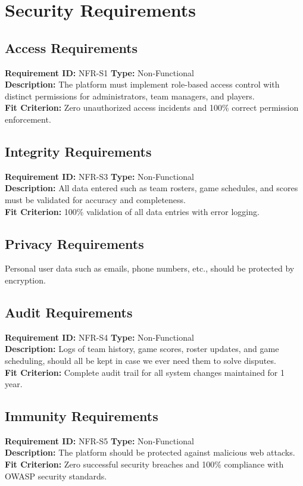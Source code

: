 \documentclass[12pt, titlepage]{article}
\begin{document}
\section{Security Requirements}
\subsection{Access Requirements}
\textbf{Requirement ID:} NFR-S1 \quad \textbf{Type:} Non-Functional \\
\textbf{Description:} The platform must implement role-based access control with distinct permissions for administrators, team managers, and players.\\
\textbf{Fit Criterion:} Zero unauthorized access incidents and 100\% correct permission enforcement.

\subsection{Integrity Requirements}
\textbf{Requirement ID:} NFR-S3 \quad \textbf{Type:} Non-Functional \\
\textbf{Description:} All data entered such as team rosters, game schedules, and scores must be validated for accuracy and completeness.\\
\textbf{Fit Criterion:} 100\% validation of all data entries with error logging.

\subsection{Privacy Requirements}
Personal user data such as emails, phone numbers, etc., should be protected by encryption.

\subsection{Audit Requirements}
\textbf{Requirement ID:} NFR-S4 \quad \textbf{Type:} Non-Functional \\
\textbf{Description:} Logs of team history, game scores, roster updates, and game scheduling, should all be kept in case we ever need them to solve disputes.\\
\textbf{Fit Criterion:} Complete audit trail for all system changes maintained for 1 year.

\subsection{Immunity Requirements}
\textbf{Requirement ID:} NFR-S5 \quad \textbf{Type:} Non-Functional \\
\textbf{Description:} The platform should be protected against malicious web attacks.\\
\textbf{Fit Criterion:} Zero successful security breaches and 100\% compliance with OWASP security standards.
\end{document}
